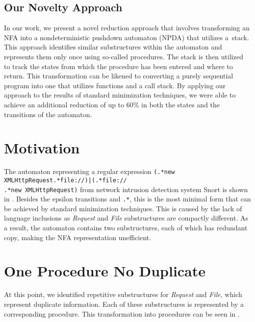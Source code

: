 \documentclass{ExcelAtFIT}
\begin{document}
	\subsection*{Our Novelty Approach}
		In our work, we present a novel reduction approach that involves transforming an NFA into a nondeterministic pushdown automaton (NPDA) that utilizes a~stack. This approach identifies similar substructures within the automaton and represents them only once using so-called procedures. The stack is then utilized to track the states from which the procedure has been entered and where to return. This transformation can be likened to converting a purely sequential program into one that utilizes functions and a call stack. By applying our approach to the results of standard minimization techniques, we were able to achieve an additional reduction of up to 60\% in both the states and the transitions of the automaton.

\section{Motivation}
	The automaton representing a regular expression \texttt{(.*new XMLHttpRequest.*file://)|(.*file://\\.*new XMLHttpRequest)} from network intrusion detection system Snort \cite{Snort} is shown in . Besides the epsilon transitions and \texttt{.*}, this is the most minimal form that can be achieved by standard minimization techniques. This is caused by the lack of language inclusions as  \textit{Request} and \textit{File} substructures are compactly different. As a result, the automaton contains two substructures, each of which has redundant copy, making the NFA representation unefficient.

\section{One Procedure No Duplicate}
	At this point, we identified repetitive substructures for \textit{Request} and \textit{File}, which represent duplicate information. Each of these substructures is represented by a corresponding procedure. This transformation into procedures can be seen in .
\end{document}

